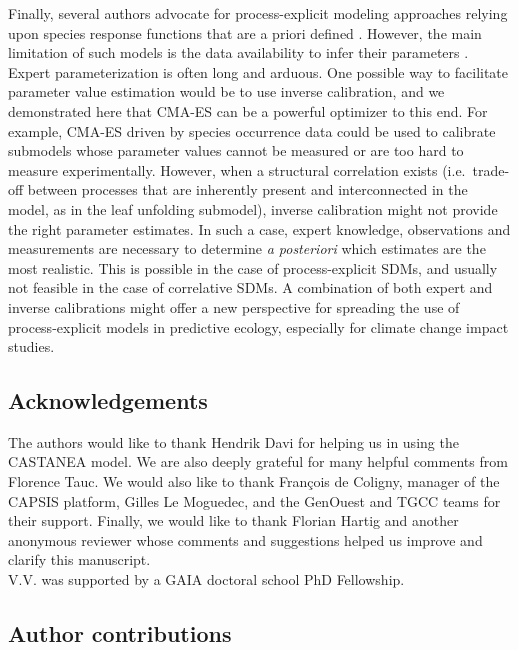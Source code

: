 Finally, several authors advocate for process-explicit modeling approaches
relying upon species response functions that are a priori defined \citep[e.g.][]{Higgins2020}.
However, the main limitation of such models is the data availability to
infer their parameters \citep{Urban2016}. Expert parameterization is often long and arduous. One
possible way to facilitate parameter value estimation would be to use
inverse calibration, and we demonstrated here that CMA-ES can be a
powerful optimizer to this end. For example, CMA-ES driven by species
occurrence data could be used to calibrate submodels whose parameter
values cannot be measured or are too hard to measure experimentally.
However, when a structural correlation exists (i.e.~trade-off between
processes that are inherently present and interconnected in the model,
as in the leaf unfolding submodel), inverse calibration might not
provide the right parameter estimates. In such a case, expert knowledge,
observations and measurements are necessary to determine \emph{a
posteriori} which estimates are the most realistic. This is possible in
the case of process-explicit SDMs, and usually not feasible in the case of
correlative SDMs. A combination of both expert and inverse calibrations
might offer a new perspective for spreading the use of process-explicit
models in predictive ecology, especially for climate change impact
studies.

\clearpage

\subsection{Acknowledgements}\label{acknowledgements}

The authors would like to thank Hendrik Davi for helping us in using the
CASTANEA model. We are also deeply grateful for many helpful comments
from Florence Tauc. We would also like to thank François de Coligny,
manager of the CAPSIS platform, Gilles Le Moguedec, and the GenOuest and
TGCC teams for their support. Finally, we would like to thank Florian
Hartig and another anonymous reviewer whose comments and suggestions
helped us improve and clarify this manuscript.\\
V.V. was supported by a GAIA doctoral school PhD Fellowship.

\subsection{Author contributions}\label{author-contributions}

